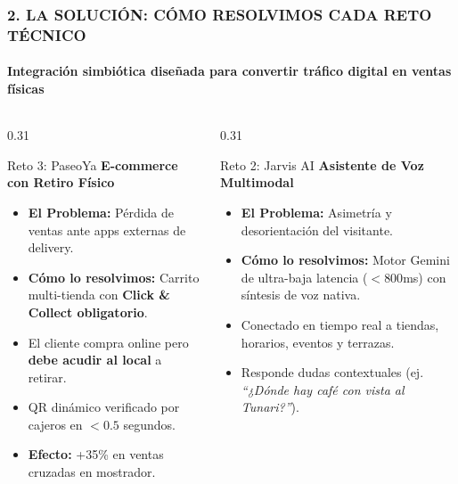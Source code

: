 \documentclass[aspectratio=169, 10pt]{beamer}
\begin{document}
\begin{frame}
  \frametitle{2. LA SOLUCIÓN: CÓMO RESOLVIMOS CADA RETO TÉCNICO}
  \framesubtitle{Integración simbiótica diseñada para convertir tráfico digital en ventas físicas}

  \begin{columns}[T]
    \begin{column}{0.31\textwidth}
      \begin{alertblock}{Reto 3: PaseoYa}
        \scriptsize
        \textbf{E-commerce con Retiro Físico}
        \begin{itemize}\setlength\itemsep{0.25em}
          \item \textbf{El Problema:} Pérdida de ventas ante apps externas de delivery.
          \item \textbf{Cómo lo resolvimos:} Carrito multi-tienda con \textbf{Click \& Collect obligatorio}.
          \item El cliente compra online pero \textbf{debe acudir al local} a retirar.
          \item QR dinámico verificado por cajeros en $<0.5$ segundos.
          \item \textbf{Efecto:} +35\% en ventas cruzadas en mostrador.
        \end{itemize}
      \end{alertblock}
    \end{column}

    \begin{column}{0.31\textwidth}
      \begin{block}{Reto 2: Jarvis AI}
        \scriptsize
        \textbf{Asistente de Voz Multimodal}
        \begin{itemize}\setlength\itemsep{0.25em}
          \item \textbf{El Problema:} Asimetría y desorientación del visitante.
          \item \textbf{Cómo lo resolvimos:} Motor Gemini de ultra-baja latencia ($<800$ms) con síntesis de voz nativa.
          \item Conectado en tiempo real a tiendas, horarios, eventos y terrazas.
          \item Responde dudas contextuales (ej. \textit{``¿Dónde hay café con vista al Tunari?''}).
        \end{itemize}
      \end{block}
    \end{column}


\end{columns}
\end{frame}
\end{document}
